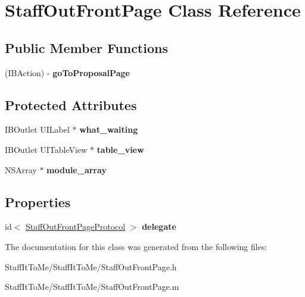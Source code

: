\hypertarget{interface_staff_out_front_page}{
\section{\-Staff\-Out\-Front\-Page \-Class \-Reference}
\label{interface_staff_out_front_page}
}
\subsection*{\-Public \-Member \-Functions}
\begin{DoxyCompactItemize}
\item 
\hypertarget{interface_staff_out_front_page_ab611fac279356c112a537ba7d5fe0a6a}{
(\-I\-B\-Action) -\/ {\bfseries go\-To\-Proposal\-Page}}
\label{interface_staff_out_front_page_ab611fac279356c112a537ba7d5fe0a6a}

\end{DoxyCompactItemize}
\subsection*{\-Protected \-Attributes}
\begin{DoxyCompactItemize}
\item 
\hypertarget{interface_staff_out_front_page_aaf441b01b3d0d0baa5ea039904814163}{
\-I\-B\-Outlet \-U\-I\-Label $\ast$ {\bfseries what\-\_\-waiting}}
\label{interface_staff_out_front_page_aaf441b01b3d0d0baa5ea039904814163}

\item 
\hypertarget{interface_staff_out_front_page_ac659e004dfa9b22db20331983c6d6176}{
\-I\-B\-Outlet \-U\-I\-Table\-View $\ast$ {\bfseries table\-\_\-view}}
\label{interface_staff_out_front_page_ac659e004dfa9b22db20331983c6d6176}

\item 
\hypertarget{interface_staff_out_front_page_ab613697d97d48c13af478e7994374090}{
\-N\-S\-Array $\ast$ {\bfseries module\-\_\-array}}
\label{interface_staff_out_front_page_ab613697d97d48c13af478e7994374090}

\end{DoxyCompactItemize}
\subsection*{\-Properties}
\begin{DoxyCompactItemize}
\item 
\hypertarget{interface_staff_out_front_page_a71afeecfaa8fa67d6a9810fb131dd3c6}{
id$<$ \hyperlink{protocol_staff_out_front_page_protocol-p}{\-Staff\-Out\-Front\-Page\-Protocol} $>$ {\bfseries delegate}}
\label{interface_staff_out_front_page_a71afeecfaa8fa67d6a9810fb131dd3c6}

\end{DoxyCompactItemize}


\-The documentation for this class was generated from the following files\-:\begin{DoxyCompactItemize}
\item 
\-Staff\-It\-To\-Me/\-Staff\-It\-To\-Me/\-Staff\-Out\-Front\-Page.\-h\item 
\-Staff\-It\-To\-Me/\-Staff\-It\-To\-Me/\-Staff\-Out\-Front\-Page.\-m\end{DoxyCompactItemize}
